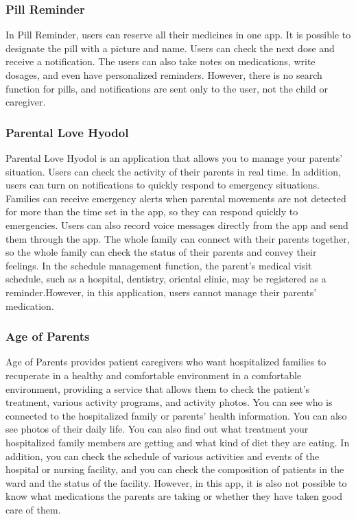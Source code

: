 \documentclass[conference]{IEEEtran}
\begin{document}
\subsubsection{Pill Reminder}
In Pill Reminder, users can reserve all their medicines in one app. It is possible to designate the pill with a picture and name. Users can check the next dose and receive a notification. The users can also take notes on medications, write dosages, and even have personalized reminders. However, there is no search function for pills, and notifications are sent only to the user, not the child or caregiver.\\

\subsubsection{Parental Love Hyodol}
Parental Love Hyodol is an application that allows you to manage your parents' situation. Users can check the activity of their parents in real time. In addition, users can turn on notifications to quickly respond to emergency situations. Families can receive emergency alerts when parental movements are not detected for more than the time set in the app, so they can respond quickly to emergencies. Users can also record voice messages directly from the app and send them through the app. The whole family can connect with their parents together, so the whole family can check the status of their parents and convey their feelings. In the schedule management function, the parent's medical visit schedule, such as a hospital, dentistry, oriental clinic, may be registered as a reminder.However, in this application, users cannot manage their parents' medication.\\

\subsubsection{Age of Parents}
Age of Parents provides patient caregivers who want hospitalized families to recuperate in a healthy and comfortable environment in a comfortable environment, providing a service that allows them to check the patient's treatment, various activity programs, and activity photos. You can see who is connected to the hospitalized family or parents' health information. You can also see photos of their daily life. You can also find out what treatment your hospitalized family members are getting and what kind of diet they are eating. In addition, you can check the schedule of various activities and events of the hospital or nursing facility, and you can check the composition of patients in the ward and the status of the facility. However, in this app, it is also not possible to know what medications the parents are taking or whether they have taken good care of them.\\
\end{document}
